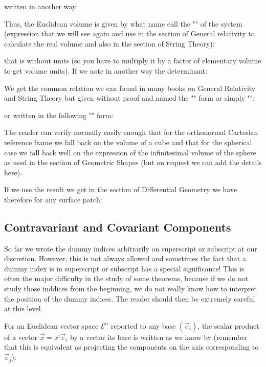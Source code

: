	written in another way:
	
	Thus, the Euclidean volume  is given by what name call the "" of the system (expression that we will see again and use in the section of General relativity to calculate the real volume and also in the section of String Theory):
		
	that is without units (so you have to multiply it by a factor of elementary volume to get volume units). If we note in another way the determinant:
		
	We get the common relation we can found in many books on General Relativity and String Theory but given without proof and named the "\label{Riemannian volume}" form or simply "":
		
	or written in the following "" form:
	
	The reader can verify normally easily enough that for the orthonormal Cartesian reference frame we fall back on the volume of a cube and that for the spherical case we fall back well on the expression of the infinitesimal volume of the sphere as used in the section of Geometric Shapes (but on request we can add the details here).
	
	If we use the result we get in the section of Differential Geometry we have therefore for any surface patch:
	

	
	\subsection{Contravariant and Covariant Components}\label{contravariant and covariant components}
	So far we wrote the dummy indices arbitrarily on superscript or subscript at our discretion. However, this is not always allowed and sometimes the fact that a dummy index is in superscript or subscript has a special significance! This is often the major difficulty in the study of some theorems, because if we do not study those inddices from the beginning, we do not really know how to interpret the position of the dummy indices. The reader should then be extremely careful at this level.

	For an Euclidean vector space $\mathcal{E}^n$ reported to any base $(\vec{e}_i)$, the scalar product of a vector $\vec{x}=x^i\vec{e}_i$ by a vector its base is written as we know by (remember that this is equivalent as projecting the components on the axis corresponding to $\vec{e}_j$):
	
